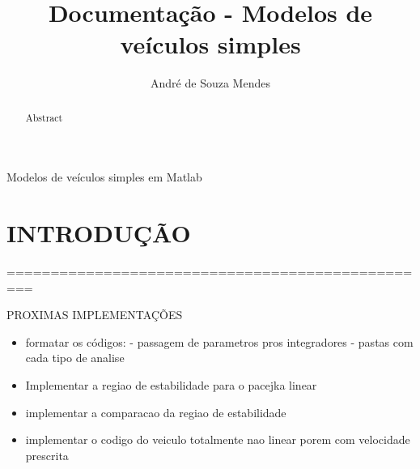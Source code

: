 \documentclass[sublist]{fei}
\author{André de Souza Mendes}
\title{Documentação - Modelos de veículos simples}
\begin{document}
\maketitle






\begin{resumo}
Modelos de veículos simples em Matlab
\end{resumo}

\begin{abstract}
Abstract
\end{abstract}

{
	\pagestyle{empty}
	\listoffigures
	\listoftables
    \tableofcontents
}

\chapter{INTRODUÇÃO} 

=================================================

PROXIMAS IMPLEMENTAÇÕES

\begin{itemize}
\item formatar os códigos: - passagem de parametros pros integradores - pastas com cada tipo de analise
\item Implementar a regiao de estabilidade para o pacejka linear
\item implementar a comparacao da regiao de estabilidade
\item implementar o codigo do veiculo totalmente nao linear porem com velocidade prescrita
\end{itemize}
\end{document}
